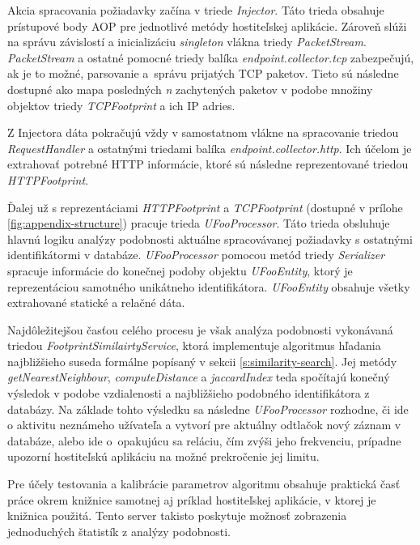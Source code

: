 \documentclass[
  digital, %
  oneside, %
  table,   %
  lof,     %
  nolot,   %
  nocover
]{fithesis3}
\begin{document}
Akcia spracovania požiadavky začína v triede \textit{Injector}. Táto trieda
obsahuje prístupové body AOP pre jednotlivé metódy hostiteľskej aplikácie.
Zároveň slúži na správu závislostí a inicializáciu \textit{singleton} vlákna
triedy \textit{PacketStream}. \textit{PacketStream} a ostatné pomocné triedy
balíka \textit{endpoint.collector.tcp} zabezpečujú, ak je to možné, parsovanie
a~správu prijatých TCP paketov. Tieto sú následne dostupné ako mapa posledných
\textit{n} zachytených paketov v podobe množiny objektov triedy \textit{TCPFootprint} a ich IP
adries.

Z Injectora dáta pokračujú vždy v samostatnom vlákne na spracovanie triedou
\textit{RequestHandler} a ostatnými triedami balíka
\textit{endpoint.collector.http}. Ich účelom je extrahovať potrebné HTTP
informácie, ktoré sú následne reprezentované triedou \textit{HTTPFootprint}.

Ďalej už s reprezentáciami \textit{HTTPFootprint} a \textit{TCPFootprint} (dostupné v prílohe \ref{fig:appendix-structure})
pracuje trieda \textit{UFooProcessor}. Táto trieda obsluhuje hlavnú logiku
analýzy podobnosti aktuálne spracovávanej požiadavky s ostatnými identifikátormi
v databáze. \textit{UFooProcessor} pomocou metód triedy \textit{Serializer} spracuje informácie do
konečnej podoby objektu \textit{UFooEntity}, ktorý je reprezentáciou samotného
unikátneho identifikátora. \textit{UFooEntity} obsahuje všetky extrahované
statické a relačné dáta.

Najdôležitejšou časťou celého procesu je však analýza podobnosti vykonávaná triedou
\textit{FootprintSimilairtyService}, ktorá implementuje algoritmus hľadania
najbližšieho suseda formálne popísaný v sekcii \ref{s:similarity-search}. Jej
metódy \textit{getNearestNeighbour},  \textit{computeDistance} a
\textit{jaccardIndex} teda spočítajú konečný výsledok v podobe vzdialenosti a
najbližšieho podobného identifikátora z databázy.
Na základe tohto výsledku sa následne \textit{UFooProcessor} rozhodne, či ide o
aktivitu neznámeho užívateľa a vytvorí pre aktuálny odtlačok nový záznam v
databáze, alebo ide o~opakujúcu sa reláciu, čím zvýši jeho frekvenciu, prípadne
upozorní hostiteľskú aplikáciu na možné prekročenie jej limitu.

Pre účely testovania a kalibrácie parametrov algoritmu obsahuje praktická časť práce okrem
knižnice samotnej aj príklad hostiteľskej aplikácie, v ktorej je knižnica
použitá. Tento server takisto poskytuje možnosť zobrazenia jednoduchých
štatistík z analýzy podobnosti.
\end{document}
